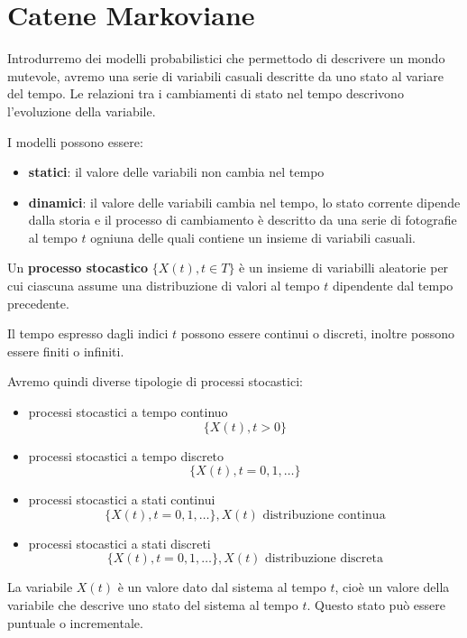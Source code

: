 \chapter*{Catene Markoviane}

Introdurremo dei modelli probabilistici che permettodo di descrivere un mondo 
mutevole, avremo una serie di variabili casuali descritte da uno stato al variare 
del tempo.  Le relazioni tra i cambiamenti di stato nel tempo descrivono l'evoluzione 
della variabile.

I modelli possono essere:
\begin{itemize}
    \item \textbf{statici}: il valore delle variabili non cambia nel tempo
    \item \textbf{dinamici}: il valore delle variabili cambia nel tempo, lo stato corrente 
    dipende dalla storia e il processo di cambiamento è descritto da una serie di fotografie al tempo $t$
    ogniuna delle quali contiene un insieme di variabili casuali.
\end{itemize}

\begin{definizione}
    Un \textbf{processo stocastico} $\{X(t), t\in T\}$ è un insieme di variabilli aleatorie 
    per cui ciascuna assume una distribuzione di valori al tempo $t$ dipendente dal 
    tempo precedente.    
\end{definizione}

Il tempo espresso dagli indici $t$ possono essere continui o discreti, inoltre possono 
essere finiti o infiniti. 

Avremo quindi diverse tipologie di processi stocastici:
\begin{itemize}
    \item processi stocastici a tempo continuo 
    $$\{X(t), t>0\}$$
    \item processi stocastici a tempo discreto 
    $$\{X(t), t=0,1,\dots\}$$
    \item processi stocastici a stati continui 
    $$\{X(t), t=0,1,\dots\}, X(t) \text{ distribuzione continua}$$
    \item processi stocastici a stati discreti
    $$\{X(t), t=0,1,\dots\}, X(t) \text{ distribuzione discreta}$$
\end{itemize}

La variabile $X(t)$ è un valore dato dal sistema al tempo $t$, cioè un valore della 
variabile che descrive uno stato del sistema al tempo $t$. Questo stato può essere 
puntuale o incrementale.

